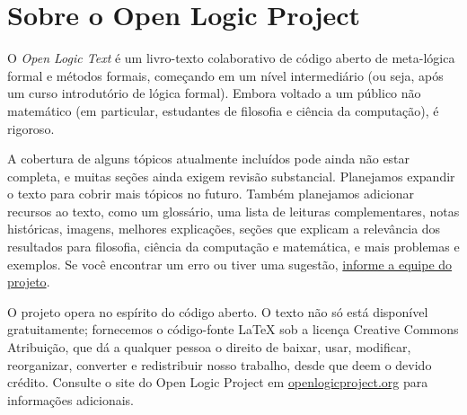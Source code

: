 \chapter*{Sobre o Open Logic Project}


O \textit{Open Logic Text} é um livro-texto colaborativo de código aberto
de meta-lógica formal e métodos formais, começando em um nível intermediário
(ou seja, após um curso introdutório de lógica formal). Embora voltado a um
público não matemático (em particular, estudantes de filosofia e
ciência da computação), é rigoroso.

A cobertura de alguns tópicos atualmente incluídos pode
ainda não estar completa, e muitas seções ainda exigem revisão substancial.
Planejamos expandir o texto para cobrir mais tópicos no
futuro. Também planejamos adicionar recursos ao texto, como um
glossário, uma lista de leituras complementares, notas históricas, imagens, melhores
explicações, seções que explicam a relevância dos resultados para
filosofia, ciência da computação e matemática, e mais problemas e
exemplos. Se você encontrar um erro ou tiver uma sugestão,
\href{https://github.com/OpenLogicProject/OpenLogic/wiki/Contributing}{informe a equipe do projeto}.

O projeto opera no espírito do código aberto. O texto não só está
disponível gratuitamente; fornecemos o código-fonte LaTeX sob a
licença Creative Commons Atribuição, que dá a qualquer pessoa o direito de
baixar, usar, modificar, reorganizar, converter e redistribuir nosso
trabalho, desde que deem o devido crédito.
Consulte o site do Open Logic Project em
\href{http://openlogicproject.org/}{openlogicproject.org} para
informações adicionais.
